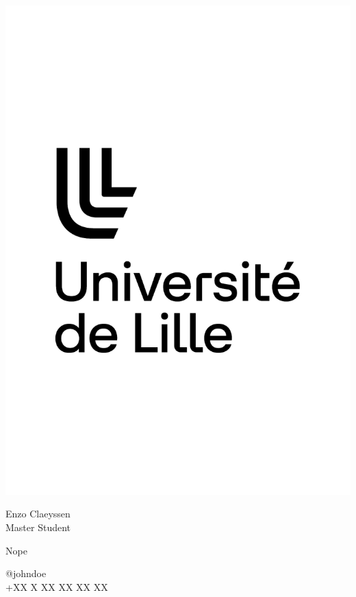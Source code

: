 \documentclass{article}
\begin{document}
\centering \includegraphics[width=.25\linewidth]{logo}\\[5pt]
\parbox{2in}{\Large \centering Enzo Claeyssen\\[1pt]
\normalsize Master Student}

\vfill
\raggedright
\begin{multicols}{2}
Nope

\columnbreak
\raggedleft
@johndoe\\
+XX X XX XX XX XX%
\end{multicols}%
\end{document}
